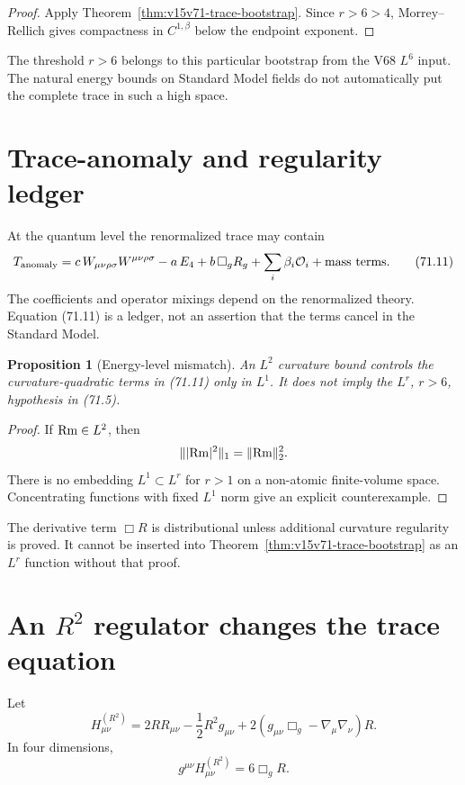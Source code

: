 \documentclass[11pt]{article}
\newtheorem{proposition}[theorem]{Proposition}
\theoremstyle{remark}
\begin{document}
\begin{proof}
Apply Theorem~\ref{thm:v15v71-trace-bootstrap}.  Since \(r>6>4\),
Morrey--Rellich gives compactness in \(C^{1,\beta}\) below the
endpoint exponent.
\end{proof}

The threshold \(r>6\) belongs to this particular bootstrap from the
V68 \(L^6\) input.  The natural energy bounds on Standard Model
fields do not automatically put the complete trace in such a high
space.

\section{Trace-anomaly and regularity ledger}

At the quantum level the renormalized trace may contain
\[
 T_{\rm anomaly}
 =
 c\,W_{\mu\nu\rho\sigma}W^{\mu\nu\rho\sigma}
 -a\,E_4+b\,\Box_gR_g
 +\sum_i\beta_i{\cal O}_i
 +\hbox{mass terms}.                                  \tag{71.11}
\]
The coefficients and operator mixings depend on the renormalized
theory.  Equation (71.11) is a ledger, not an assertion that the
terms cancel in the Standard Model.

\begin{proposition}[Energy-level mismatch]
\label{prop:v15v71-energy-mismatch}
An \(L^2\) curvature bound controls the curvature-quadratic terms in
(71.11) only in \(L^1\).  It does not imply the
\(L^r\), \(r>6\), hypothesis in (71.5).
\end{proposition}

\begin{proof}
If \({\rm Rm}\in L^2\), then
\[
 \||{\rm Rm}|^2\|_1=\|{\rm Rm}\|_2^2.
\]
There is no embedding \(L^1\subset L^r\) for \(r>1\) on a
non-atomic finite-volume space.  Concentrating functions with fixed
\(L^1\) norm give an explicit counterexample.
\end{proof}

The derivative term \(\Box R\) is distributional unless additional
curvature regularity is proved.  It cannot be inserted into
Theorem~\ref{thm:v15v71-trace-bootstrap} as an \(L^r\) function
without that proof.

\section{An \(R^2\) regulator changes the trace equation}

Let
\[
 H^{(R^2)}_{\mu\nu}
 =
 2R R_{\mu\nu}-\frac12R^2g_{\mu\nu}
 +2(g_{\mu\nu}\Box_g-\nabla_\mu\nabla_\nu)R.           \tag{71.12}
\]
In four dimensions,
\[
 g^{\mu\nu}H^{(R^2)}_{\mu\nu}=6\Box_gR.               \tag{71.13}
\]
\end{document}
